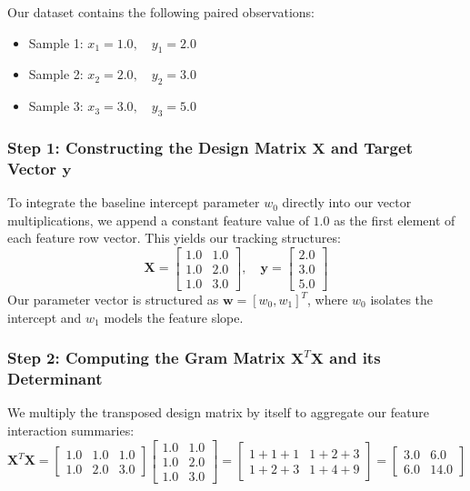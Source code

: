 \documentclass{article}
\begin{document}
Our dataset contains the following paired observations:
\begin{itemize}
    \item Sample 1: $x_1 = 1.0, \quad y_1 = 2.0$
    \item Sample 2: $x_2 = 2.0, \quad y_2 = 3.0$
    \item Sample 3: $x_3 = 3.0, \quad y_3 = 5.0$
\end{itemize}

\subsubsection{Step 1: Constructing the Design Matrix $\mathbf{X}$ and Target Vector $\mathbf{y}$}
To integrate the baseline intercept parameter $w_0$ directly into our vector multiplications, we append a constant feature value of $1.0$ as the first element of each feature row vector. This yields our tracking structures:
\begin{equation}
\mathbf{X} = \begin{bmatrix} 1.0 & 1.0 \\ 1.0 & 2.0 \\ 1.0 & 3.0 \end{bmatrix}, \quad \mathbf{y} = \begin{bmatrix} 2.0 \\ 3.0 \\ 5.0 \end{bmatrix}
\end{equation}
Our parameter vector is structured as $\mathbf{w} = [w_0, w_1]^T$, where $w_0$ isolates the intercept and $w_1$ models the feature slope.

\subsubsection{Step 2: Computing the Gram Matrix $\mathbf{X}^T\mathbf{X}$ and its Determinant}
We multiply the transposed design matrix by itself to aggregate our feature interaction summaries:
\begin{equation}
\mathbf{X}^T \mathbf{X} = \begin{bmatrix} 1.0 & 1.0 & 1.0 \\ 1.0 & 2.0 & 3.0 \end{bmatrix} \begin{bmatrix} 1.0 & 1.0 \\ 1.0 & 2.0 \\ 1.0 & 3.0 \end{bmatrix} = \begin{bmatrix} 1+1+1 & 1+2+3 \\ 1+2+3 & 1+4+9 \end{bmatrix} = \begin{bmatrix} \mathbf{3.0} & \mathbf{6.0} \\ \mathbf{6.0} & \mathbf{14.0} \end{bmatrix}
\end{equation}
\end{document}
